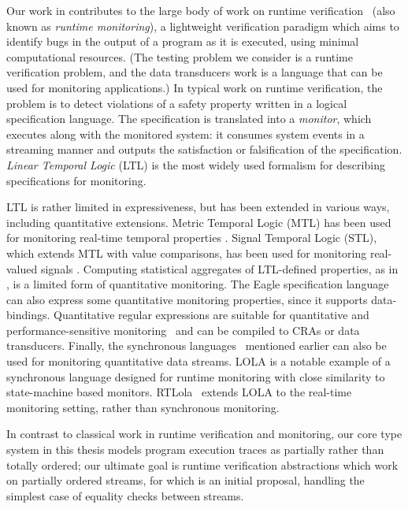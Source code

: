 Our work in  contributes to the large body of work on runtime verification~\cite{leucker2009brief,havelund2004efficient} (also known as \emph{runtime monitoring}), a
lightweight verification paradigm which aims to identify bugs in the
output of a program as it is executed, using minimal computational
resources.
(The testing problem we consider is a runtime verification problem, and
the data transducers work is a language that can be used for monitoring applications.)
In typical work on runtime verification, the problem is to detect
violations of a safety property written in a logical specification language.
The specification is translated into a \emph{monitor}, which executes along with the monitored system: it consumes system events in a streaming manner and outputs the satisfaction or falsification of the specification. \emph{Linear Temporal Logic} (LTL) is the most widely used formalism for describing specifications for monitoring.

LTL is rather limited in expressiveness, but has been extended in various ways,
including quantitative extensions.
Metric Temporal Logic (MTL) has been used for monitoring real-time temporal properties \cite{TR2005MTL}. Signal Temporal Logic (STL), which extends MTL with value comparisons, has been used for monitoring real-valued signals \cite{DDGJJS2017}.
Computing statistical aggregates of LTL-defined properties, as in \cite{finkbeiner2002collecting}, is a limited form of quantitative monitoring.
The Eagle specification language \cite{barringer2004rule} can also express some quantitative monitoring properties, since it supports data-bindings.
Quantitative regular expressions are suitable for quantitative and performance-sensitive monitoring~\cite{QRE,StreamQRE,YLMMAL2017NQRE,AAMMR2018}
and can be compiled to CRAs or data transducers.
Finally, the synchronous languages~\cite{BCEHlGdS2003SL} mentioned earlier can also be used for monitoring quantitative data streams.
LOLA \cite{d2005lola,bozzelli2016foundations} is a notable example of a synchronous language designed for runtime monitoring
with close similarity to state-machine based monitors.
RTLola~\cite{faymonville2017real} extends LOLA to the real-time monitoring setting, rather than synchronous monitoring.

In contrast to classical work in runtime verification and monitoring, our core type system in this thesis models program execution traces as partially rather than totally ordered; our ultimate goal is runtime verification abstractions which work on partially ordered streams, for which  is an initial proposal, handling the simplest case of equality checks between streams.

